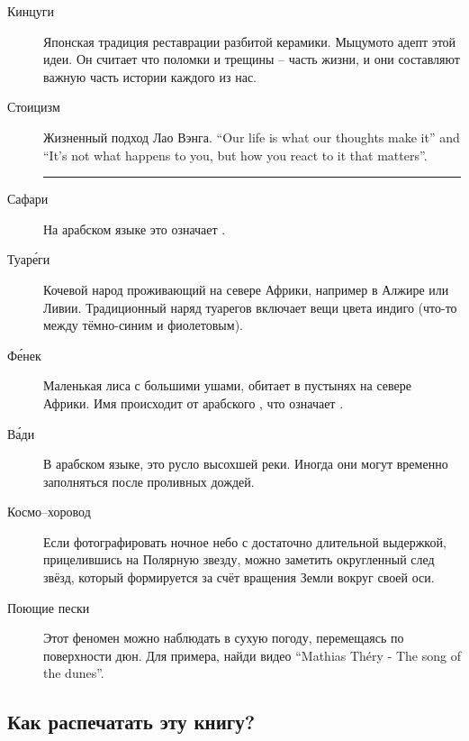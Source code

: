 \documentclass[a5paper,11pt]{memoir}
\begin{document}
\begin{description}
\item[Кинцуги] Японская традиция реставрации разбитой керамики. Мыцумото адепт этой идеи. Он считает что поломки и трещины -- часть жизни, и они составляют важную часть истории каждого из нас.

\item[Стоицизм] Жизненный подход Лао Вэнга.
``Our life is what our thoughts make it'' and ``It's not what happens to you, but how you react to it that matters''.
\fancybreak{*}

\item[Сафари] На арабском языке это означает .

\item[Туар\'{е}ги] Кочевой народ проживающий на севере Африки, например в Алжире или Ливии. Традиционный наряд туарегов включает вещи цвета индиго (что-то между тёмно-синим и фиолетовым).


\item[Ф\'{е}нек] Маленькая лиса с большими ушами, обитает в пустынях на севере Африки. Имя происходит от арабского , что означает . 


\item[В\'{а}ди] В арабском языке, это русло высохшей реки. Иногда они могут временно заполняться после проливных дождей.

\item[Космо--хоровод] Если фотографировать ночное небо с достаточно длительной выдержкой, прицелившись на Полярную звезду, можно заметить округленный след звёзд, который формируется за счёт вращения Земли вокруг своей оси.

\item[Поющие пески] Этот феномен можно наблюдать в сухую погоду, перемещаясь по поверхности дюн. Для примера, найди видео ``Mathias Th\'ery - The song of the dunes''.
\end{description}





\clearpage
\subsection{Как распечатать эту книгу?}

\renewcommand{\thefootnote}{\fnsymbol{footnote}}
\end{document}
